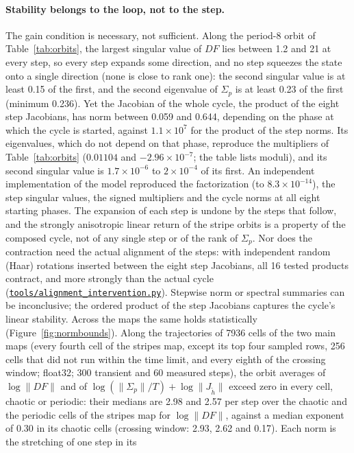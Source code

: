 \documentclass[11pt,letterpaper]{article}
\newcommand{\repourl}{https://github.com/tdj28/neural-shrimp}
\newcommand{\reporef}{arxiv-v1}
\newcommand{\repo}[1]{\href{\repourl/blob/\reporef/#1}{\nolinkurl{#1}}}
\begin{document}
\paragraph{Stability belongs to the loop, not to the step.} The gain condition is necessary, not sufficient. Along
the period-8 orbit of Table~\ref{tab:orbits}, the largest singular value of $DF$ lies between 1.2 and 21 at every
step, so every step expands some direction, and no step squeezes the state onto a single direction (none is close to rank one): the second singular value is
at least 0.15 of the first, and the second eigenvalue of $\Sigma_p$ is at least 0.23 of the first (minimum 0.236). Yet the Jacobian of the whole
cycle, the product of the eight step Jacobians, has norm between 0.059 and 0.644, depending on the phase at which the
cycle is started, against $1.1\times10^{7}$ for the product of the step norms. Its eigenvalues, which do not depend
on that phase, reproduce the multipliers of Table~\ref{tab:orbits} ($0.01104$ and $-2.96\times10^{-7}$; the table
lists moduli), and its second singular value is $1.7\times10^{-6}$ to $2\times10^{-4}$ of its first. An independent
implementation of the model reproduced the factorization (to $8.3\times10^{-14}$), the step singular values, the
signed multipliers and the cycle norms at all eight starting phases. The expansion of each step is undone by the
steps that follow, and the strongly anisotropic linear return of the stripe orbits is a property of the composed
cycle, not of any single step or of the rank of $\Sigma_p$. Nor does the contraction need the actual alignment of
the steps: with independent random (Haar) rotations inserted between the eight step Jacobians, all 16 tested products
contract, and more strongly than the actual cycle (\repo{tools/alignment_intervention.py}). Stepwise norm or
spectral summaries can be inconclusive; the ordered product of the step Jacobians captures the cycle's linear
stability. Across the maps the same holds statistically (Figure~\ref{fig:normbounds}). Along the trajectories
of 7936 cells of the two main maps (every fourth cell of the stripes map, except its top four sampled rows, 256
cells that did not run within the time limit, and every eighth of the crossing window; float32; 300 transient and 60
measured steps), the orbit averages of $\log\|DF\|$ and of
$\log(\|\Sigma_p\|/T)+\log\|J_{\tilde h}\|$ exceed zero in every cell, chaotic or periodic: their medians are 2.98 and
2.57 per step over the chaotic and the periodic cells of the stripes map for $\log\|DF\|$, against a median exponent of
0.30 in its chaotic cells (crossing window: 2.93, 2.62 and 0.17). Each norm is the stretching of one step in its
\end{document}
